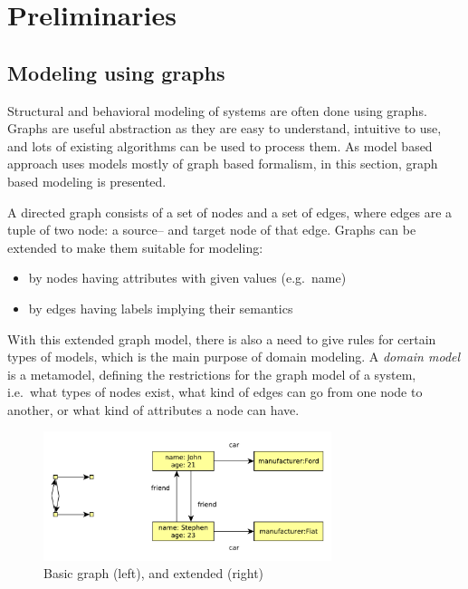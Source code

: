 
\chapter{Preliminaries}


\section{Modeling using graphs}

Structural and behavioral modeling of systems are often done using graphs. 
Graphs are useful abstraction as they are easy to understand, intuitive to use, and lots of existing algorithms can be used to process them. 
As model based approach uses models mostly of graph based formalism, in this section, graph based modeling is presented.

A directed graph consists of a set of nodes and a set of edges, where edges are a tuple of two node: a source-- and target node of that edge. 
Graphs can be extended to make them suitable for modeling:

\begin{itemize}
	\item by nodes having attributes with given values (e.g.\ name)
	\item by edges having labels implying their semantics
\end{itemize}

With this extended graph model, there is also a need to give rules for certain types of models, which is the main purpose of domain modeling.
A \emph{domain model} is a metamodel, defining the restrictions for the graph model of a system, i.e.\ what types of nodes exist, what kind of edges can go from one node to another, or what kind of attributes a node can have.

\begin{figure}[h]
	\begin{center}
		\includegraphics[width=0.75\textwidth]{figures/graphs.pdf}
		\caption{Basic graph (left), and extended (right) }
		\label{fig:graphs}
	\end{center}
\end{figure}


